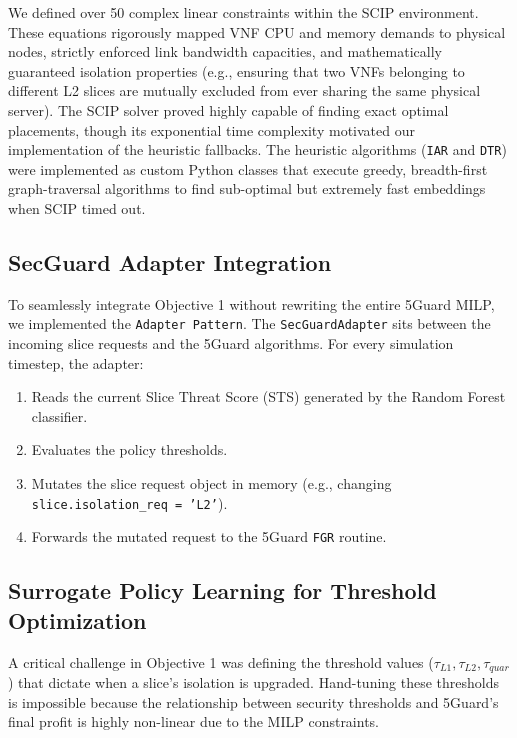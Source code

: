 \documentclass[12pt]{article}
\begin{document}
We defined over 50 complex linear constraints within the SCIP environment. These equations rigorously mapped VNF CPU and memory demands to physical nodes, strictly enforced link bandwidth capacities, and mathematically guaranteed isolation properties (e.g., ensuring that two VNFs belonging to different L2 slices are mutually excluded from ever sharing the same physical server). The SCIP solver proved highly capable of finding exact optimal placements, though its exponential time complexity motivated our implementation of the heuristic fallbacks. The heuristic algorithms (\texttt{IAR} and \texttt{DTR}) were implemented as custom Python classes that execute greedy, breadth-first graph-traversal algorithms to find sub-optimal but extremely fast embeddings when SCIP timed out.

\subsection{SecGuard Adapter Integration}
To seamlessly integrate Objective 1 without rewriting the entire 5Guard MILP, we implemented the \texttt{Adapter Pattern}. The \texttt{SecGuardAdapter} sits between the incoming slice requests and the 5Guard algorithms. 
For every simulation timestep, the adapter:
\begin{enumerate}
    \item Reads the current Slice Threat Score (STS) generated by the Random Forest classifier.
    \item Evaluates the policy thresholds.
    \item Mutates the slice request object in memory (e.g., changing \texttt{slice.isolation\_req = 'L2'}).
    \item Forwards the mutated request to the 5Guard \texttt{FGR} routine.
\end{enumerate}

\subsection{Surrogate Policy Learning for Threshold Optimization}
A critical challenge in Objective 1 was defining the threshold values ($\tau_{L1}, \tau_{L2}, \tau_{quar}$) that dictate when a slice's isolation is upgraded. Hand-tuning these thresholds is impossible because the relationship between security thresholds and 5Guard's final profit is highly non-linear due to the MILP constraints.
\end{document}
